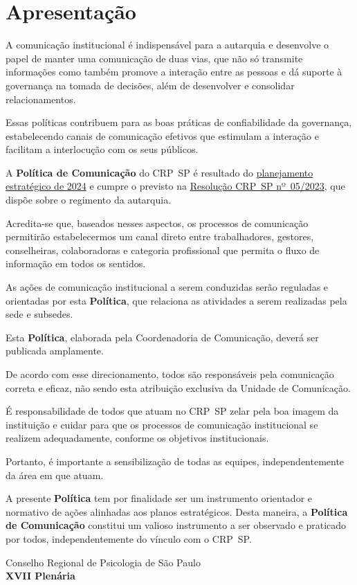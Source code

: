 \chapter*{Apresentação}

A comunicação institucional é indispensável para a autarquia e desenvolve o papel de manter uma comunicação de duas vias, que não só transmite informações como também promove a interação entre as pessoas e dá suporte à governança na tomada de decisões, além de desenvolver e consolidar relacionamentos.

Essas políticas contribuem para as boas práticas de confiabilidade da governança, estabelecendo canais de comunicação efetivos que estimulam a interação e facilitam a interlocução com os seus públicos.

A \textbf{Política de Comunicação} do CRP~SP é resultado do \href{https://transparencia.cfp.org.br/crp06/planejamento/planejamento-estrategico-2024/}{planejamento estratégico de 2024} e cumpre o previsto na \href{https://transparencia.cfp.org.br/crp06/legislacao/regimento-interno-do-conselho-regional-de-psicologia-de-sao-paulo-6a-regiao-aprovado-pela-resolucao-no-5-de-22-de-marco-de-2023/}{Resolução CRP~SP nº~05/2023}, que dispõe sobre o regimento da autarquia.

Acredita-se que, baseados nesses aspectos, os processos de comunicação permitirão estabelecermos um canal direto entre trabalhadores, gestores, conselheiras, colaboradoras e categoria profissional que permita o fluxo de informação em todos os sentidos.

As ações de comunicação institucional a serem conduzidas serão reguladas e orientadas por esta \textbf{Política}, que relaciona as atividades a serem realizadas pela sede e subsedes.

Esta \textbf{Política}, elaborada pela Coordenadoria de Comunicação, deverá ser publicada amplamente.

De acordo com esse direcionamento, todos são responsáveis pela comunicação correta e eficaz, não sendo esta atribuição exclusiva da
Unidade de Comunicação.

É responsabilidade de todos que atuam no CRP~SP zelar pela boa imagem da instituição e cuidar para que os processos de comunicação institucional se realizem adequadamente, conforme os objetivos institucionais.

Portanto, é importante a sensibilização de todas as equipes, independentemente da área em que atuam.

A presente \textbf{Política} tem por finalidade ser um instrumento orientador e normativo de ações alinhadas aos planos estratégicos. Desta
maneira, a \textbf{Política de Comunicação} constitui um valioso instrumento a ser observado e praticado por todos, independentemente do
vínculo com o CRP~SP.

\begin{flushright}
Conselho Regional de Psicologia de São Paulo\\\textbf{XVII Plenária}
\end{flushright}